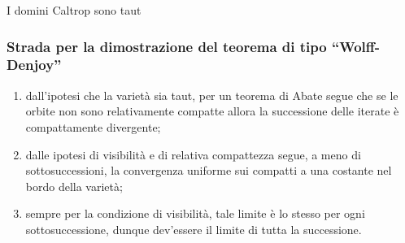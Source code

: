\begin{frame}{I domini Caltrop sono taut}
\end{frame}

\begin{frame}
  \frametitle{Strada per la dimostrazione del teorema di tipo ``Wolff-Denjoy''}
  \begin{enumerate}
    \item dall'ipotesi che la varietà sia taut, per un teorema di Abate segue che se le orbite non sono relativamente compatte allora la successione delle iterate è compattamente divergente;\pause
    \item dalle ipotesi di visibilità e di relativa compattezza segue, a meno di sottosuccessioni, la convergenza uniforme sui compatti a una costante nel bordo della varietà;\pause
    \item sempre per la condizione di visibilità, tale limite è lo stesso per ogni sottosuccessione, dunque dev'essere il limite di tutta la successione.
  \end{enumerate}
\end{frame}
